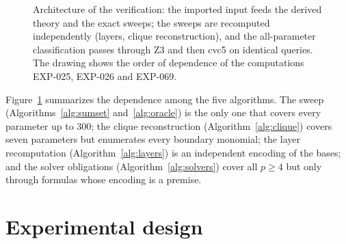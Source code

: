 \documentclass[11pt]{article}
\theoremstyle{definition}
\theoremstyle{remark}
\begin{document}
\begin{figure}[ht]
\centering
{}
\caption{Architecture of the verification: the imported input feeds the derived theory and
the exact sweeps; the sweeps are recomputed independently (layers, clique reconstruction), and the
all-parameter classification passes through Z3 and then cvc5 on identical queries. The drawing
shows the order of dependence of the computations EXP-025, EXP-026 and EXP-069.}
\label{fig:pipeline}
\end{figure}

Figure~\ref{fig:pipeline} summarizes the dependence among the five algorithms. The sweep
(Algorithms~\ref{alg:sumset} and~\ref{alg:oracle}) is the only one that covers every parameter
up to $300$; the clique reconstruction (Algorithm~\ref{alg:clique}) covers seven parameters but
enumerates every boundary monomial; the layer recomputation (Algorithm~\ref{alg:layers}) is an
independent encoding of the bases; and the solver obligations (Algorithm~\ref{alg:solvers})
cover all $p\geq4$ but only through formulas whose encoding is a premise.

\section{Experimental design}\label{sec:design}
\end{document}
